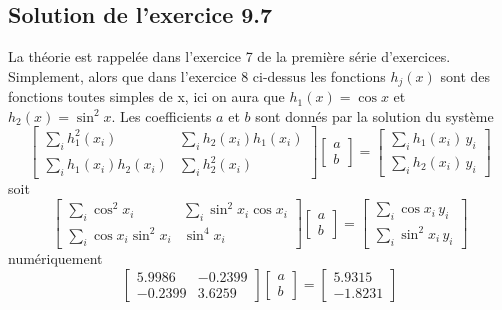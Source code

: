 \subsection*{Solution de l'exercice 9.7}

La théorie est rappelée dans l'exercice 7 de la première série d'exercices. Simplement, alors que dans l'exercice 8 ci-dessus les fonctions $h_j(x)$ sont des fonctions toutes simples de x, ici on aura que $h_1(x)=\cos{x}$ et $h_2(x)=\sin^{2}{x}$. Les coefficients $a$ et $b$ sont donnés par la solution du système
\begin{equation*}
\begin{bmatrix}
\sum_i h_1^2(x_i)       & \sum_i h_2(x_i)h_1(x_i) \\
\sum_i h_1(x_i)h_2(x_i) & \sum_i h_2^2(x_i)
\end{bmatrix}
\begin{bmatrix} a \\ b \end{bmatrix}=
\begin{bmatrix}
\sum_ih_1(x_i)\,y_i\\
\sum_ih_2(x_i)\,y_i
\end{bmatrix}
\end{equation*}
soit
\begin{equation*}
\begin{bmatrix}
\sum_i \cos^2{x_i} & \sum_i \sin^2{x_i}\cos{x_i} \\
\sum_i \cos{x_i}\sin^2{x_i} & \sin^4{x_i}
\end{bmatrix}
\begin{bmatrix} a \\ b \end{bmatrix}=
\begin{bmatrix}
\sum_i\cos{x_i}\,y_i\\
\sum_i\sin^2{x_i}\,y_i
\end{bmatrix}
\end{equation*}
numériquement
\begin{equation*}
\begin{bmatrix}
    5.9986 &  -0.2399 \\
   -0.2399 &   3.6259
\end{bmatrix}
\begin{bmatrix} a \\ b \end{bmatrix}=
\begin{bmatrix} 5.9315 \\ -1.8231 \end{bmatrix}
\end{equation*}
